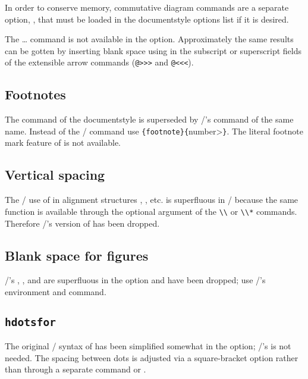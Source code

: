 In order to conserve memory, commutative diagram commands are a separate
option, , that must be loaded in the documentstyle options list
if it is desired.

The \dots{} command is not available in the
 option. Approximately the same results can be gotten by
inserting blank space using  in the subscript or
superscript fields of the extensible arrow commands (\verb=@>>>= and
\verb=@<<<=).

\subsection{Footnotes}

The  command of the  documentstyle
is superseded by \latex/'s command of
the same name.  Instead of the \amstex/ 
command use \verb"{footnote}{"\<number>\verb"}".  The
literal footnote mark feature of  is not available.

\subsection{Vertical spacing}

The \amstex/ use of  in alignment structures
, , etc. is superfluous in \latex/
because the same function is available
through the optional
argument of the \verb"\\" or \verb"\\*" commands.  Therefore
\amstex/'s version of  has been dropped.

\subsection{Blank space for figures}

\amstex/'s , , 
and
 are superfluous in the  option and have
been dropped; use \latex/'s  environment and 
command.

\subsection{{\tt\bslash hdotsfor}}

The original \amstex/ syntax of  has been simplified
somewhat in the  option; \amstex/'s  is
not needed.  The spacing between
dots is adjusted via a square-bracket
option rather than through a separate command  or
.

